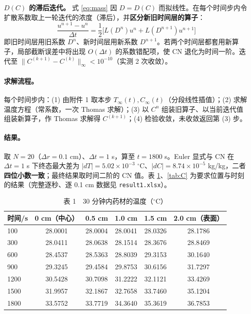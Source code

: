 \documentclass[12pt,a4paper]{ctexart}
\begin{document}
\textbf{$D(C)$ 的滞后迭代。} 式 \eqref{eq:mass} 因 $D=D(C)$ 而拟线性。在每个时间步内令扩散系数取上一轮迭代的浓度（滞后），并\textbf{区分新旧时间层的算子}：
\begin{equation}
\frac{u^{n+1}-u^{n}}{\Delta t}
=\frac12\Big[L(D^n)u^{n}+L(D^{n+1})u^{n+1}\Big]
\label{eq:cn_varc}
\end{equation}
即旧时间层用旧系数 $D^n$、新时间层用新系数 $D^{n+1}$。若两个时间层都套用新算子，局部截断误差中将出现 $O(\Delta t)$ 的系数错配项，使 CN 退化为时间一阶。迭代至 $\|C^{(k+1)}-C^{(k)}\|_\infty<10^{-10}$（实测 2 次收敛）。

\paragraph{求解流程。} 每个时间步内：(1) 由附件 1 取本步 $T_\infty(t),C_\infty(t)$（分段线性插值）；(2) 求解温度方程（常系数，一次 Thomas 求解）；(3) 以 $C^n$ 组装旧算子、以当前迭代值组装新算子，作 Thomas 求解得 $C^{(k+1)}$；(4) 检验收敛，未收敛返回第 (3) 步。

\paragraph{结果。} 取 $N=20$（$\Delta r=0.1$ cm）、$\Delta t=1$ s，算至 $t=1800$ s。Euler 显式与 CN 在 $\Delta t=1$ s 下终态最大差为 $|dT|=5.02\times10^{-3}$ $^\circ$C、$|dC|=8.74\times10^{-5}$ kg/kg，二者\textbf{四位小数一致}；最终结果取时间二阶的 CN 值。表 \ref{tab:T}、\ref{tab:C} 为要求位置与时刻的结果（完整逐秒、逐 0.1 cm 数据见 \texttt{result1.xlsx}）。

\begin{table}[H]
\centering
\caption{表 1　30 分钟内药材的温度（$^\circ$C）}
\label{tab:T}
\begin{tabular}{lccccc}
\toprule
时间/s & 0 cm（中心） & 0.5 cm & 1.0 cm & 1.5 cm & 2.0 cm（表面） \\
\midrule
100  & 28.0001 & 28.0004 & 28.0041 & 28.0326 & 28.1786 \\
300  & 28.0411 & 28.0638 & 28.1514 & 28.3676 & 28.8469 \\
600  & 28.4537 & 28.5363 & 28.8039 & 29.3153 & 30.1640 \\
900  & 29.3245 & 29.4584 & 29.8753 & 30.6156 & 31.7297 \\
1200 & 30.5428 & 30.7098 & 31.2222 & 32.1121 & 33.4269 \\
1500 & 31.9957 & 32.1867 & 32.7658 & 33.7460 & 35.1204 \\
1800 & 33.5752 & 33.7719 & 34.3640 & 35.3619 & 36.7853 \\
\bottomrule
\end{tabular}
\end{table}
\end{document}
